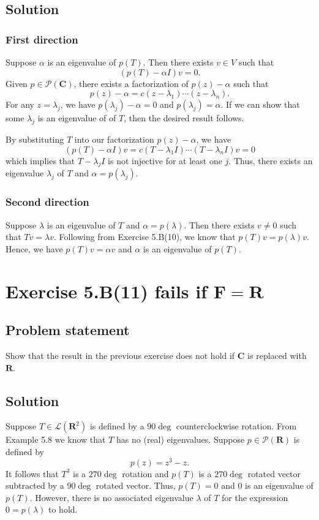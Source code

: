 \documentclass{article}
\begin{document}
\subsection*{Solution}
\subsubsection*{First direction}  
Suppose $\alpha$ is an eigenvalue of $p(T)$. 
Then there exists $v\in V$ such that 
\[(p(T)-\alpha I)v=0.\]
Given $p\in\mathcal{P}(\mathbf{C})$, there exists a factorization of $p(z)-\alpha$ such that 
\[p(z)-\alpha=c(z-\lambda_1)\cdots(z-\lambda_n).\]
For any $z=\lambda_j$, we have $p(\lambda_j)-\alpha=0$ and $p(\lambda_j)=\alpha$. 
If we can show that some $\lambda_j$ is an eigenvalue of of $T$, then the desired result follows.

By substituting $T$ into our factorization $p(z)-\alpha$, we have
\[(p(T)-\alpha I)v=c(T-\lambda_1 I)\cdots(T-\lambda_n I)v=0\]
which implies that $T-\lambda_j I$ is not injective for at least one $j$. 
Thus, there exists an eigenvalue $\lambda_j$ of $T$ and $\alpha=p(\lambda_j)$.

\subsubsection*{Second direction}  
Suppose $\lambda$ is an eigenvalue of $T$ and $\alpha = p(\lambda)$. 
Then there exists $v \neq 0$ such that $Tv=\lambda v$.
Following from Exercise 5.B(10), we know that $p(T)v=p(\lambda)v$. 
Hence, we have $p(T)v=\alpha v$ and $\alpha$ is an eigenvalue of $p(T)$.

\clearpage

\section{Exercise 5.B(11) fails if $\mathbf{F}=\mathbf{R}$}
\subsection*{Problem statement}  
Show that the result in the previous exercise does not hold if $\mathbf{C}$ is replaced with $\mathbf{R}$.

\subsection*{Solution}
Suppose $T\in\mathcal{L}(\mathbf{R}^2)$ is defined by a $90\deg$ counterclockwise rotation. 
From Example 5.8 we know that $T$ has no (real) eigenvalues. 
Suppose $p\in\mathcal{P}(\mathbf{R})$ is defined by
\[p(z)=z^3-z.\]
It follows that $T^3$ is a $270\deg$ rotation and $p(T)$ is a $270\deg$ rotated vector subtracted by a $90\deg$ rotated vector. 
Thus, $p(T)=0$ and $0$ is an eigenvalue of $p(T)$. 
However, there is no associated eigenvalue $\lambda$ of $T$ for the expression $0=p(\lambda)$ to hold.
\end{document}
